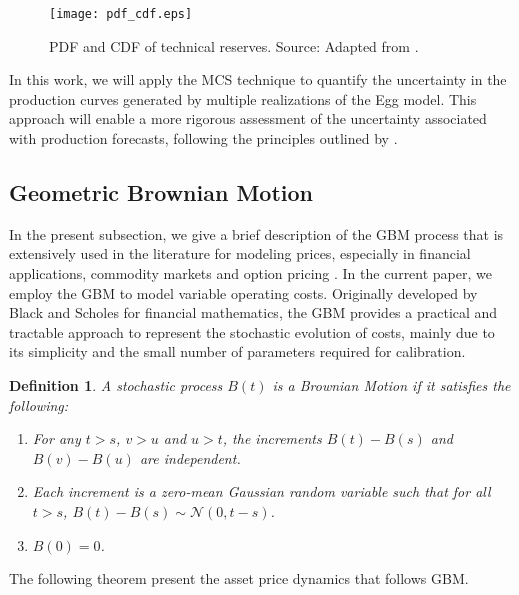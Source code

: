 \documentclass[pdflatex,sn-basic]{sn-jnl}%
\theoremstyle{thmstyleone}%
\theoremstyle{thmstyletwo}%
\theoremstyle{thmstylethree}%
\newtheorem{definition}{Definition}%
\begin{document}
\begin{figure}[H]
\centering
\begin{minipage}{0.75\textwidth}
  \texttt{[image: pdf\_cdf.eps]}
  \caption{PDF and CDF of technical reserves. Source: Adapted from \cite{ref24}.}
  \label{fig7}
\end{minipage}
\end{figure}

In this work, we will apply the MCS technique to quantify the uncertainty in the production curves generated by multiple realizations of the Egg model. This approach will enable a more rigorous assessment of the uncertainty associated with production forecasts, following the principles outlined by \cite{ref24}. 

\subsection{Geometric Brownian Motion}\label{subsec43}

In the present subsection, we give a brief description of the GBM process that is extensively used in the literature for modeling prices, especially in financial applications, commodity markets and option pricing \citep{ref25}. In the current paper, we employ the GBM to model variable operating costs. Originally developed by Black and Scholes for financial mathematics, the GBM provides a practical and tractable approach to represent the stochastic evolution of costs, mainly due to its simplicity and the small number of parameters required for calibration. 

\begin{definition}
A stochastic process $B(t)$ is a Brownian Motion if it satisfies the following:
\begin{enumerate}[label=(\roman*)]
    \item For any $t > s$, $v > u$ and $u > t$, the increments $B(t) - B(s)$ and $B(v) - B(u)$ are independent.
    \item Each increment is a zero-mean Gaussian random variable such that for all $t > s$, $B(t) - B(s) \sim \mathcal{N}(0, t-s)$.
    \item $B(0) = 0$.
\end{enumerate}
\end{definition}

The following theorem present the asset price dynamics that follows GBM.
\end{document}

